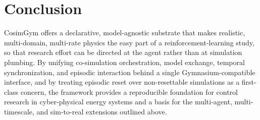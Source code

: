 \documentclass[preprint,12pt]{elsarticle}
\begin{document}
\section{Conclusion}\label{sec:conclusion}
CosimGym offers a declarative, model-agnostic substrate that makes realistic,
multi-domain, multi-rate physics the easy part of a reinforcement-learning study,
so that research effort can be directed at the agent rather than at simulation
plumbing. By unifying co-simulation orchestration, model exchange, temporal
synchronization, and episodic interaction behind a single Gymnasium-compatible
interface, and by treating episodic reset over non-resettable simulations as a
first-class concern, the framework provides a reproducible foundation for control
research in cyber-physical energy systems and a basis for the multi-agent,
multi-timescale, and sim-to-real extensions outlined above.


% 
\end{document}
